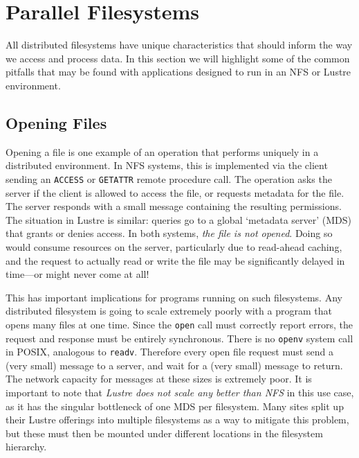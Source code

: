 \section{Parallel Filesystems}\label{sec:parallel_fs}

All distributed filesystems have unique characteristics that should
inform the way we access and process data.  In this section we
will highlight some of the common pitfalls that may be found with
applications designed to run in an NFS or Lustre environment.

\subsection{Opening Files}

Opening a file is one example of an operation that performs uniquely
in a distributed environment.  In NFS systems, this is implemented
via the client sending an \verb!ACCESS! or \verb!GETATTR! remote
procedure call.  The operation asks the server if the client is allowed
to access the file, or requests metadata for the file.  The server
responds with a small message containing the resulting permissions.
The situation in Lustre is similar: queries go to a global `metadata
server' (MDS) that grants or denies access.  In both systems,
\emph{the file is not opened}.  Doing so would consume resources on
the server, particularly due to read-ahead caching, and the request
to actually read or write the file may be significantly delayed in
time---or might never come at all!

%

This has important implications for programs running on such
filesystems.  Any distributed filesystem is going to scale extremely
poorly with a program that opens many files at one time.  Since the
\verb!open! call must correctly report errors, the request and response
must be entirely synchronous.  There is no \verb!openv! system call in
POSIX, analogous to \verb!readv!.  Therefore every open file request
must send a (very small) message to a server, and wait for a (very
small) message to return.  The network capacity for messages at these
sizes is extremely poor.  It is important to note that \emph{Lustre
does not scale any better than NFS} in this use case, as it has the
singular bottleneck of one MDS per filesystem.  Many sites split up
their Lustre offerings into multiple filesystems as a way to mitigate
this problem, but these must then be mounted under different
locations in the filesystem hierarchy.

